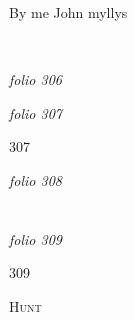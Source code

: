 \documentclass[12pt, a4paper]{book}
\begin{document}
		\ifthenelse{\isodd{\thepage}}
		{\reversemarginpar}
		{\normalmarginpar}
		By me John myllys



  



\dotfill
						\newpage
{}

\textit{folio 306}


         \vspace*{4cm}
         
\dotfill
						

\textit{folio 307}


\begin{flushright}{\color{Mahogany}307}\end{flushright}

\dotfill
						\newpage
{}

\textit{folio 308}


         \vspace*{4cm}
         
\dotfill
						  \section*{}  \subsection*{}

\textit{folio 309}



\begin{flushright}{\color{Mahogany}309}\end{flushright}

				\begin{center} \begin{large} {\scshape Hunt} \end{large} \end{center}
			
\end{document}

